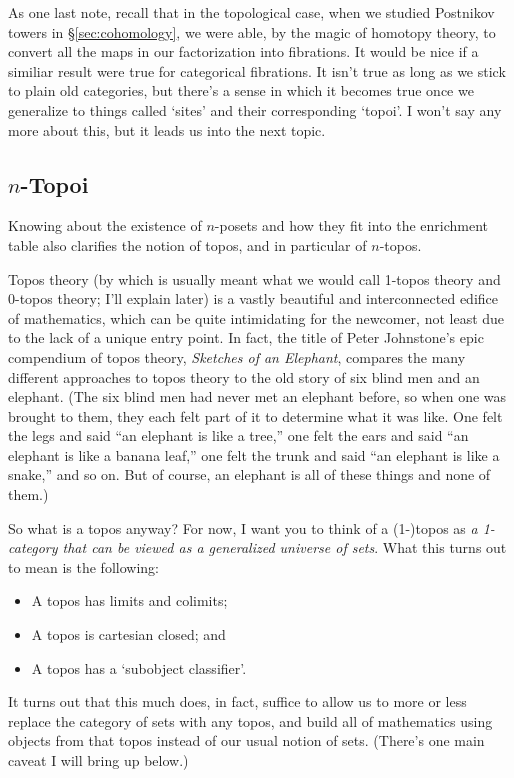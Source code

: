 \documentclass[12pt]{amsart}
\begin{document}
As one last note, recall that in the topological case, when we studied
Postnikov towers in \S\ref{sec:cohomology}, we were able, by the magic
of homotopy theory, to convert all the maps in our factorization into
fibrations.  It would be nice if a similiar result were true for
categorical fibrations.  It isn't true as long as we stick to plain
old categories, but there's a sense in which it becomes true once we
generalize to things called `sites' and their corresponding `topoi'.
I won't say any more about this, but it leads us into the next topic.


\subsection{$n$-Topoi}
\label{sec:n-topoi}

Knowing about the existence of $n$-posets and how they fit into the
enrichment table also clarifies the notion of topos, and in particular
of $n$-topos.

Topos theory (by which is usually meant what we would call 1-topos
theory and 0-topos theory; I'll explain later) is a vastly beautiful
and interconnected edifice of mathematics, which can be quite
intimidating for the newcomer, not least due to the lack of a unique
entry point.  In fact, the title of Peter Johnstone's epic compendium
of topos theory, {\sl Sketches of an Elephant}, compares the many
different approaches to topos theory to the old story of six blind men
and an elephant.  (The six blind men had never met an elephant before,
so when one was brought to them, they each felt part of it to
determine what it was like.  One felt the legs and said ``an elephant
is like a tree,'' one felt the ears and said ``an elephant is like a
banana leaf,'' one felt the trunk and said ``an elephant is like a
snake,'' and so on.  But of course, an elephant is all of these things
and none of them.)

So what is a topos anyway?  For now, I want you to think of a
(1-)topos as \emph{a 1-category that can be viewed as a generalized
  universe of sets}.  What this turns out to mean is the following:
\begin{itemize}
\item A topos has limits and colimits;
\item A topos is cartesian closed; and
\item A topos has a `subobject classifier'.
\end{itemize}

It turns out that this much does, in fact, suffice to allow us to more
or less replace the category of sets with any topos, and build all of
mathematics using objects from that topos instead of our usual notion
of sets.  (There's one main caveat I will bring up below.)
\end{document}
